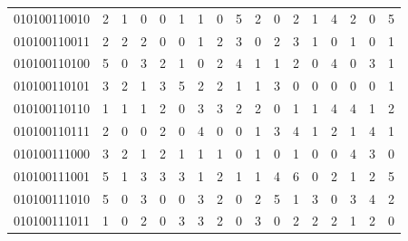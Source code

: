 \documentclass[10pt,a4paper]{article}
\begin{document}
\begin{longtable}{ |c|c|c|c|c|c|c|c|c|c|c|c|c|c|c|c|c| }
    010100110010              & 2                            & 1                                & 0                            & 0                              & 1   & 1   & 0   & 5   & 2   & 0   & 2   & 1   & 4   & 2   & 0   & 5   \\
    010100110011              & 2                            & 2                                & 2                            & 0                              & 0   & 1   & 2   & 3   & 0   & 2   & 3   & 1   & 0   & 1   & 0   & 1   \\
    010100110100              & 5                            & 0                                & 3                            & 2                              & 1   & 0   & 2   & 4   & 1   & 1   & 2   & 0   & 4   & 0   & 3   & 1   \\
    010100110101              & 3                            & 2                                & 1                            & 3                              & 5   & 2   & 2   & 1   & 1   & 3   & 0   & 0   & 0   & 0   & 0   & 1   \\
    010100110110              & 1                            & 1                                & 1                            & 2                              & 0   & 3   & 3   & 2   & 2   & 0   & 1   & 1   & 4   & 4   & 1   & 2   \\
    010100110111              & 2                            & 0                                & 0                            & 2                              & 0   & 4   & 0   & 0   & 1   & 3   & 4   & 1   & 2   & 1   & 4   & 1   \\
    010100111000              & 3                            & 2                                & 1                            & 2                              & 1   & 1   & 1   & 0   & 1   & 0   & 1   & 0   & 0   & 4   & 3   & 0   \\
    010100111001              & 5                            & 1                                & 3                            & 3                              & 3   & 1   & 2   & 1   & 1   & 4   & 6   & 0   & 2   & 1   & 2   & 5   \\
    010100111010              & 5                            & 0                                & 3                            & 0                              & 0   & 3   & 2   & 0   & 2   & 5   & 1   & 3   & 0   & 3   & 4   & 2   \\
    010100111011              & 1                            & 0                                & 2                            & 0                              & 3   & 3   & 2   & 0   & 3   & 0   & 2   & 2   & 2   & 1   & 2   & 0   \\

\end{longtable}
\end{document}
